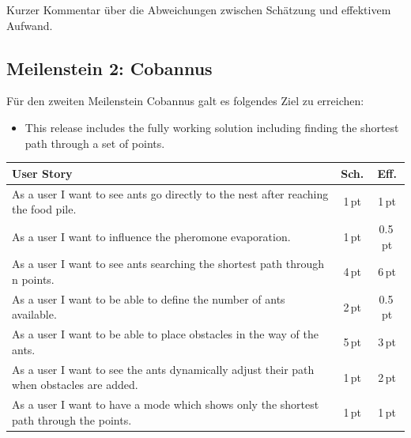 
\vspace*{1cm}

Kurzer Kommentar über die Abweichungen zwischen Schätzung und effektivem Aufwand. \\


\vspace*{1cm}



\subsection{Meilenstein 2: Cobannus}


Für den zweiten Meilenstein Cobannus galt es folgendes Ziel zu erreichen:

\begin{itemize}[noitemsep]
\item This release includes the fully working solution including finding the shortest path through a set of points.
\end{itemize}

\begin{table}[H]
\small\sffamily\renewcommand{\arraystretch}{1.5}
\begin{tabular}{| p{12cm} | c | c |}
  \hline
  \bfseries{User Story} & \bfseries{Sch.} & \bfseries{Eff.}  \\
  \hline
  As a user I want to see ants go directly to the nest after reaching the food pile. & 1\,pt & 1\,pt \\
  \hline
  As a user I want to influence the pheromone evaporation. & 1\,pt & 0.5\,pt \\
  \hline
  As a user I want to see ants searching the shortest path through n points. & 4\,pt & 6\,pt \\
  \hline
  As a user I want to be able to define the number of ants available. & 2\,pt & 0.5\,pt \\
  \hline
  As a user I want to be able to place obstacles in the way of the ants. & 5\,pt & 3\,pt \\
  \hline
  As a user I want to see the ants dynamically adjust their path when obstacles are added. & 1\,pt & 2\,pt \\
  \hline
  As a user I want to have a mode which shows only the shortest path through the points. & 1\,pt & 1\,pt \\
  \hline
\end{tabular}
\end{table}

